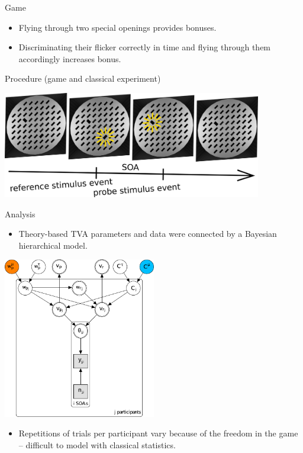 \documentclass[a0paper,portrait]{baposter}
\begin{document}
\begin{poster}
\begin{posterbox}[name=game,span=1,column=1,row=1,below=intro]{Game}
\begin{itemize}
\item Flying through two special openings provides bonuses.
\end{itemize}
\begin{itemize}
\item Discriminating their flicker correctly in time and flying through them accordingly increases bonus.
\end{itemize}
\end{posterbox}

\begin{posterbox}[name=procedure,span=2,column=0,row=2, below=game]{Procedure (game and classical experiment)}
\begin{center}
\includegraphics[width=0.85\textwidth]{procedurev2.pdf}
\end{center}
\end{posterbox}

\begin{posterbox}[name=results,span=1,column=2,row=0]{Analysis}
\begin{itemize}
\item Theory-based TVA parameters and data were connected by a Bayesian hierarchical model.
\end{itemize}
	\begin{center}
	\includegraphics[width=0.5\textwidth]{graphmod.pdf}
	\end{center}
\begin{itemize}
\item Repetitions of trials per participant vary because of the freedom in the game -- difficult to model with classical statistics.
\end{itemize}


\end{posterbox}
\end{poster}
\end{document}
